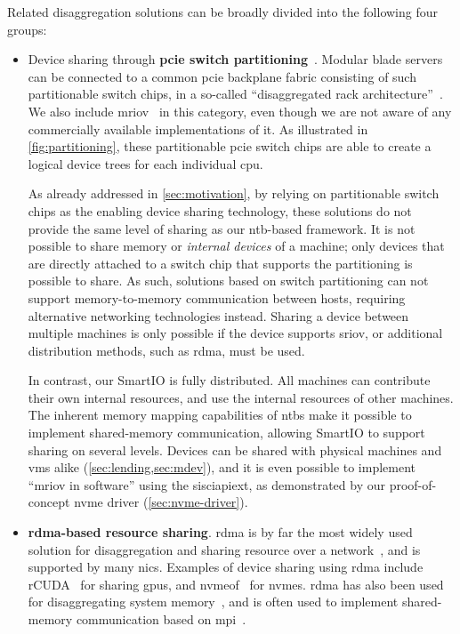 Related \gls{disaggregation} solutions can be broadly divided into the following four groups:
%
\begin{itemize}
    \item Device sharing through \textbf{\Gls{pcie} switch partitioning}~\cite{whitepaper:Microsemi,Wong2011,whitepaper:IDT,Chung2018}.
        Modular blade servers can be connected to a common \gls{pcie} backplane fabric consisting of such partitionable switch chips, in a so-called ``\gls{disaggregated} rack architecture''~\cite{url:rackscale,url:liqid,url:gigaio,Tu2014}.
        We also include \gls{mriov}~\cite{spec:MRIOV} in this category, even though we are not aware of any commercially available implementations of it.
        As illustrated in \cref{fig:partitioning}, these partitionable \gls{pcie} switch chips are able to create a logical device trees for each individual \gls{cpu}.

        
        As already addressed in \cref{sec:motivation}, by relying on partitionable switch chips as the enabling device sharing technology, these solutions do not provide the same level of sharing as our \gls{ntb}-based framework.
        It is not possible to share memory or \emph{internal devices} of a machine; only devices that are directly attached to a switch chip that supports the partitioning is possible to share.
        As such, solutions based on switch partitioning can not support memory-to-memory communication between hosts, requiring alternative networking technologies instead.
        Sharing a device between multiple machines is only possible if the device supports \gls{sriov}, or additional distribution methods, such as \gls{rdma}, must be used.
        

        In contrast, our SmartIO is fully distributed.
        All machines can contribute their own internal resources, and use the internal resources of other machines.
        The inherent memory mapping capabilities of \glspl{ntb} make it possible to implement shared-memory communication, allowing SmartIO to support sharing on several levels.
        Devices can be shared with physical machines and \glspl{vm} alike (\cref{sec:lending,sec:mdev}), and it is even possible to implement ``\gls{mriov} in software'' using the \gls{sisciapiext}, as demonstrated by our proof-of-concept \gls{nvme} driver (\cref{sec:nvme-driver}).
        

    \item \textbf{\gls{rdma}-based resource sharing}.
        \Gls{rdma} is by far the most widely used solution for \gls{disaggregation} and sharing resource over a network~\cite{Trivedi2011}, and is supported by many \glspl{nic}.
        Examples of device sharing using \gls{rdma} include rCUDA~\cite{Duato2010} for sharing \glspl{gpu}, and \gls{nvmeof}~\cite{Guz2018} for \glspl{nvme}.
        \Gls{rdma} has also been used for \gls{disaggregating} system memory~\cite{Liang2005,Gu2017,Aguilera2018}, and is often used to implement shared-memory communication based on \gls{mpi}~\cite{Huang2012,Jiang2004,Lu2013,Venkatesh2014,Venkatesh2017}.



\end{itemize}
